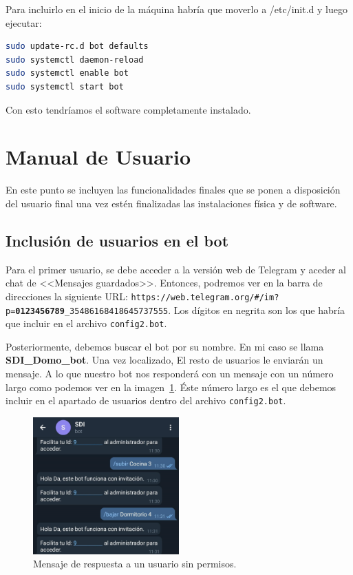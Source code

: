 Para incluirlo en el inicio de la máquina habría que moverlo a /etc/init.d y luego ejecutar: 
\begin{lstlisting}[language=sh, firstnumber=0, caption={Líneas para incluir el demonio en el inicio.}]  
sudo update-rc.d bot defaults
sudo systemctl daemon-reload
sudo systemctl enable bot
sudo systemctl start bot
\end{lstlisting}  

Con esto tendríamos el software completamente instalado.

\section{Manual de Usuario}
En este punto se incluyen las funcionalidades finales que se ponen a disposición del usuario final una vez estén finalizadas las instalaciones física y de software.

\subsection{Inclusión de usuarios en el bot}
Para el primer usuario, se debe acceder a la versión web de Telegram y aceder al chat de <<Mensajes guardados>>. Entonces, podremos ver en la barra de direcciones la siguiente URL: \texttt{https://web.telegram.org/#/im?p=\textbf{0123456789}_35486168418645737555}. Los dígitos en negrita son los que habría que incluir en el archivo \texttt{config2.bot}.

Posteriormente, debemos buscar el bot por su nombre. En mi caso se llama \textbf{SDI\_Domo\_bot}.
Una vez localizado, El resto de usuarios le enviarán un mensaje. A lo que nuestro bot nos responderá con un mensaje con un número largo como podemos ver en la imagen~\ref{Bot:SinPermisos}. Éste número largo es el que debemos incluir en el apartado de usuarios dentro del archivo \texttt{config2.bot}.

\begin{figure}[h]
\centering
\includegraphics[width=0.5\textwidth]{img/SalidasBot/botSinPermisos.jpeg}
\caption{Mensaje de respuesta a un usuario sin permisos.}\label{Bot:SinPermisos}
\end{figure}

